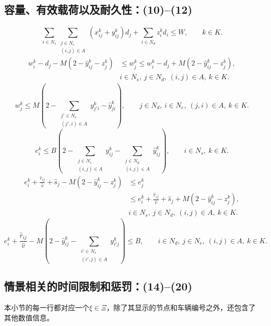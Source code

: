 \documentclass[10pt]{article}
\begin{document}
\subsection*{容量、有效载荷以及耐久性：(10)–(12)}
\begin{equation}
\sum_{i\in N_s}\sum_{\substack{j\in N_c\\(i,j)\in A}}(x_{ij}^k+y_{ij}^k)d_j+\sum_{i\in N_d}z_i^k d_i\leq W,
\qquad k\in K.\tag{10}
\end{equation}
\begin{equation}
\begin{aligned}
w_i^k-d_j-M(2-\hat y_{ij}^k-z_j^k)
&\leq w_j^k\leq w_i^k-d_j+M(2-\hat y_{ij}^k-z_j^k),\\
&i\in N_s,\ j\in N_d,\ (i,j)\in A,\ k\in K.
\end{aligned}\tag{11a}
\end{equation}
\begin{equation}
w_j^k\leq M\left(2-\sum_{\substack{j'\in N_s\\(j',i)\in A}}y_{j'i}^k-\hat y_{ji}^k\right),
\qquad j\in N_d,\ i\in N_e,\ (j,i)\in A,\ k\in K.\tag{11b}
\end{equation}
\begin{equation}
e_i^k\leq B\left(2-\sum_{\substack{j\in N_e\\(i,j)\in A}}y_{ij}^k-\sum_{\substack{j\in N_d\\(i,j)\in A}}\hat y_{ij}^k\right),
\qquad i\in N_s,\ k\in K.\tag{12a}
\end{equation}
\begin{equation}
\begin{aligned}
e_i^k+\frac{\hat r_{ij}}{\hat v}+\hat s_j-M(2-\hat y_{ij}^k-z_j^k)
&\leq e_j^k\\
&\leq e_i^k+\frac{\hat r_{ij}}{\hat v}+\hat s_j+M(2-\hat y_{ij}^k-z_j^k),\\
&i\in N_s,\ j\in N_d,\ (i,j)\in A,\ k\in K.
\end{aligned}\tag{12b}
\end{equation}
\begin{equation}
e_i^k+\frac{\hat r_{ij}}{\hat v}-M\left(2-\hat y_{ij}^k-\sum_{\substack{i'\in N_s\\(i',j)\in A}}y_{i'j}^k\right)\leq B,
\qquad i\in N_d,\ j\in N_e,\ (i,j)\in A,\ k\in K.\tag{12c}
\end{equation}

\subsection*{情景相关的时间限制和惩罚：(14)–(20)}
本小节的每一行都对应一个$\xi\in\Xi$，除了其显示的节点和车辆编号之外，还包含了其他数值信息。
\end{document}
